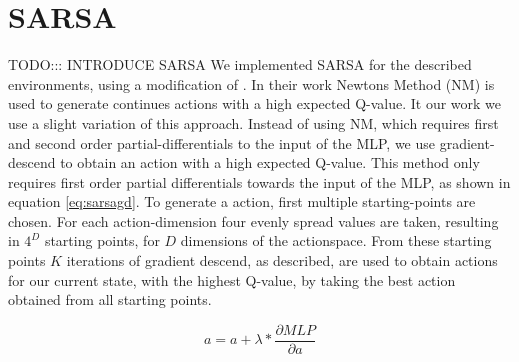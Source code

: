 
\section{SARSA}
TODO::: INTRODUCE SARSA
We implemented SARSA for the described environments, using a modification of \cite{https://www.elen.ucl.ac.be/Proceedings/esann/esannpdf/es2014-175.pdf}. In their work Newtons Method (NM) is used to generate continues actions with a high expected Q-value.
It our work we use a slight variation of this approach. Instead of using NM, which requires first and second order partial-differentials to the input of the MLP, we use gradient-descend to obtain an action with a high expected Q-value. This method only requires first order partial differentials towards the input of the MLP, as shown in equation \eqref{eq:sarsagd}.
To generate a action, first multiple starting-points are chosen. For each action-dimension four evenly spread values are taken, resulting in $4 ^ D$ starting points, for $D$ dimensions of the actionspace. From these starting points $K$ iterations of gradient descend, as described, are used to obtain actions for our current state, with the highest Q-value, by taking the best action obtained from all starting points.


\begin{equation}
\label{eq:sarsagd}
a = a + \lambda * \frac{\partial MLP}{\partial a}
\end{equation}
